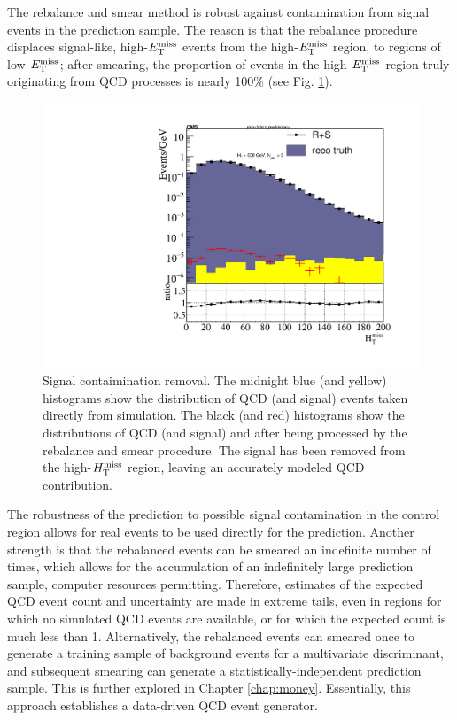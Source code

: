 The rebalance and smear method is robust against contamination from signal events in the prediction sample. The reason is that the rebalance procedure displaces signal-like, high-$E_{\text{T}}^{\rm miss}$ events from the high-$E_{\text{T}}^{\rm miss}$ region, to regions of low-$E_{\text{T}}^{\rm miss}$; after smearing, the proportion of events in the high-$E_{\text{T}}^{\rm miss}$ region truly originating from QCD processes is nearly 100\% (see Fig. \ref{fig:RplusSContamination}). 
\begin{figure}[tb!]
\centering
\includegraphics[width=0.6\linewidth]{figures/SusySearches/Ra2b2016/RplusSContam.pdf}
\caption{Signal contaimination removal. The midnight blue (and yellow) histograms show the distribution of QCD (and signal) events taken directly from simulation. The black (and red) histograms show the distributions of QCD (and signal) and after being processed by the rebalance and smear procedure. The signal has been removed from the high-$H_{\text{T}}^{\rm miss}$ region, leaving an accurately modeled QCD contribution.}
\label{fig:RplusSContamination}
\end{figure}
The robustness of the prediction to possible signal contamination in the control region allows for real events to be used directly for the prediction. Another strength is that the rebalanced events can be smeared an indefinite number of times, which allows for the accumulation of an indefinitely large prediction sample, computer resources permitting. Therefore, estimates of the expected QCD event count and uncertainty are made in extreme tails, even in regions for which no simulated QCD events are available, or for which the expected count is much less than 1. Alternatively, the rebalanced events can smeared once to generate a training sample of background events for a multivariate discriminant, and subsequent smearing can generate a statistically-independent prediction sample. This is further explored in Chapter \ref{chap:money}. Essentially, this approach establishes a data-driven QCD event generator.
\FloatBarrier

